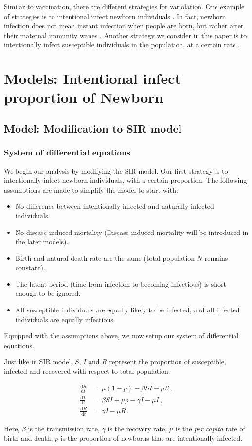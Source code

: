 \documentclass[12pt]{article}
\newcommand\dbyd[2]{\frac{\mathrm d{#1}}{\mathrm d{#2}}}
\begin{document}
Similar to vaccination, there are different strategies for variolation. One example of strategies is to intentional infect newborn individuals \cite{dabrera2014case}. In fact, newborn infection does not mean instant infection when people are born, but rather after their maternal immunity wanes \cite{elgert2009immunology}. Another strategy we consider in this paper is to intentionally infect susceptible individuals in the population, at a certain rate \cite{streefland1999patterns}. 

\section{Models: Intentional infect proportion of Newborn}
\subsection{Model: Modification to SIR model}
\subsubsection{System of differential equations}
We begin our analysis by modifying the SIR model. Our first strategy is to intentionally infect newborn individuals, with a certain proportion.  The following assumptions are made to simplify the model to start with:
\begin{itemize}
\item No difference between intentionally infected and naturally infected individuals.
\item No disease induced mortality (Disease induced mortality will be introduced in the later models).
\item Birth and natural death rate are the same (total population $N$ remains constant).
\item The latent period (time from infection to becoming infectious) is short enough to be ignored.
\item All susceptible individuals are equally likely to be infected, and all infected individuals are equally infectious.
\end{itemize}
Equipped with the assumptions above, we now setup our system of differential equations.

Just like in SIR model, $S$, $I$ and $R$ represent the proportion of susceptible, infected and recovered with respect to total population.
\begin{linenomath*}
\begin{equation}\label{1}
\begin{split}
\dbyd{S}{t}&=\mu(1-p)- \beta SI-\mu S \,,\\
\dbyd{I}{t}&=\beta SI+\mu p-\gamma I -\mu I\,,\\
\dbyd{R}{t}&=\gamma I-\mu R\,.
\end{split}
\end{equation}
\end{linenomath*}
Here, $\beta$ is the transmission rate, $\gamma$ is the recovery rate,
$\mu$ is the \emph{per capita} rate of birth and death, $p$ is the
proportion of newborns that are intentionally infected.
\end{document}
